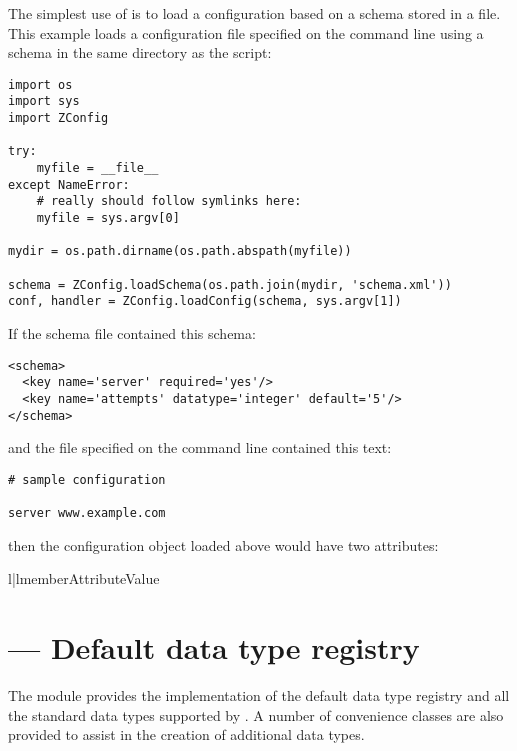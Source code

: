 \documentclass{howto}
\begin{document}
The simplest use of  is to load a configuration
based on a schema stored in a file.  This example loads a
configuration file specified on the command line using a schema in the
same directory as the script:

\begin{verbatim}
import os
import sys
import ZConfig

try:
    myfile = __file__
except NameError:
    # really should follow symlinks here:
    myfile = sys.argv[0]

mydir = os.path.dirname(os.path.abspath(myfile))

schema = ZConfig.loadSchema(os.path.join(mydir, 'schema.xml'))
conf, handler = ZConfig.loadConfig(schema, sys.argv[1])
\end{verbatim}

If the schema file contained this schema:

\begin{verbatim}
<schema>
  <key name='server' required='yes'/>
  <key name='attempts' datatype='integer' default='5'/>
</schema>
\end{verbatim}

and the file specified on the command line contained this text:

\begin{verbatim}
# sample configuration

server www.example.com
\end{verbatim}

then the configuration object  loaded above would have two
attributes:

\begin{tableii}{l|l}{member}{Attribute}{Value}
\end{tableii}


\section{ --- Default data type registry}


The  module provides the implementation of
the default data type registry and all the standard data types
supported by .  A number of convenience classes are
also provided to assist in the creation of additional data types.
\end{document}
